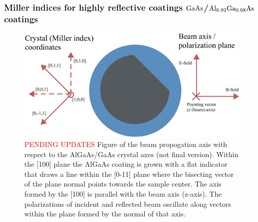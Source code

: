 
\subsubsection{Miller indices for highly reflective coatings $\mathrm{GaAs}$/$\mathrm{Al_{0.92}Ga_{0.08}As}$ coatings}

\begin{figure}[H]
\begin{center}
\includegraphics[width=\textwidth]{figs/ALGAAS/algaas_sample_diagram.png}
\end{center}
\caption{\textcolor{red}{PENDING UPDATES} Figure of the beam propogation axis with respect to the AlGaAs/GaAs crystal axes (not final version). Within the [100] plane the AlGaAs coating is grown with a flat indicator that draws a line within the [0-11] plane where the bisecting vector of the plane normal points towards the sample center. The axis formed by the [100] is parallel with the beam axis (z-axis). The polarizations of incident and reflected beam oscillate along vectors within the plane formed by the normal of that axis.}
\label{fig:algaas_coords}
\end{figure}

